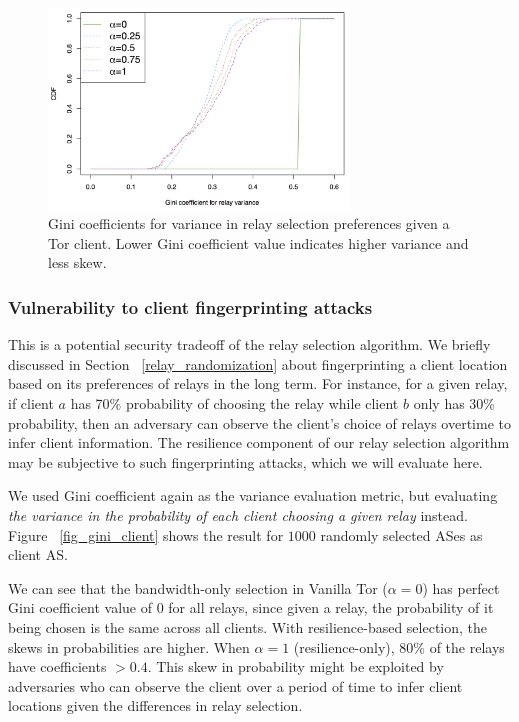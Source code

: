 \begin{figure}[ht!]
\centering
\includegraphics[width=80mm]{figure/gini_relay_variance}
\caption{Gini coefficients for variance in relay selection preferences given a Tor client. Lower Gini coefficient value indicates higher variance and less skew. \label{fig_gini}}
\end{figure}

\subsubsection{Vulnerability to client fingerprinting attacks}
This is a potential security tradeoff of the relay selection algorithm. We briefly discussed in Section ~\ref{relay_randomization} about fingerprinting a client location based on its preferences of relays in the long term. For instance, for a given relay, if client $a$ has 70\% probability of choosing the relay while client $b$ only has 30\% probability, then an adversary can observe the client's choice of relays overtime to infer client information. The resilience component of our relay selection algorithm may be subjective to such fingerprinting attacks, which we will evaluate here. 

We used Gini coefficient again as the variance evaluation metric, but evaluating \emph{the variance in the probability of each client choosing a given relay} instead. Figure ~\ref{fig_gini_client} shows the result for $1000$ randomly selected ASes as client AS. 

We can see that the bandwidth-only selection in Vanilla Tor ($\alpha = 0$) has perfect Gini coefficient value of 0 for all relays, since given a relay, the probability of it being chosen is the same across all clients. With resilience-based selection, the skews in probabilities are higher. When $\alpha = 1$ (resilience-only), $80\%$ of the relays have coefficients $> 0.4$. This skew in probability might be exploited by adversaries who can observe the client over a period of time to infer client locations given the differences in relay selection.

